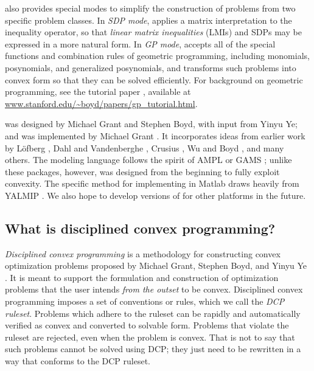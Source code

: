 \documentclass[12pt]{article}
\begin{document}
\cvx also provides special modes to simplify 
the construction of problems
from two specific problem classes. In \emph{SDP mode}, \cvx applies
a matrix interpretation to the inequality operator, so that
\emph{linear matrix inequalities} (LMIs) and SDPs may be expressed
in a more natural form. In \emph{GP mode}, \cvx accepts all of the
special functions and combination rules of geometric programming,
including monomials, posynomials, and generalized posynomials,
and transforms such problems into convex form
so that they can be solved efficiently.
For background on geometric programming, see the tutorial paper
\cite{BKVH:05}, available
at \url{www.stanford.edu/~boyd/papers/gp_tutorial.html}.

\cvx was designed by Michael Grant and Stephen Boyd, with input from
Yinyu Ye; and was implemented by Michael Grant \cite{GBY}. It
incorporates ideas from earlier work by 
L\"{o}fberg \cite{YALMIP}, 
Dahl and Vandenberghe \cite{CVXOPT}, 
Crusius \cite{Cru:02}, 
Wu and Boyd \cite{SDPSOL},
and many others.
The modeling language follows
the spirit of AMPL \cite{AMPL} or GAMS \cite{GAMS}; unlike
these packages, however, \cvx was designed from the beginning 
to fully exploit convexity.
The specific method for implementing \cvx in Matlab
draws heavily from YALMIP \cite{YALMIP}. We also hope
to develop versions of \cvx for other platforms in the future.

\subsection{What is disciplined convex programming?}
\label{sec:what-is-dcp}

\emph{Disciplined convex programming} is
a methodology for constructing convex optimization problems
proposed by Michael Grant, Stephen Boyd, and Yinyu Ye \cite{GBY,Gra:04}.
It is meant to support the formulation and
construction of optimization problems that the user 
intends \emph{from the outset} to be convex.
Disciplined convex programming imposes a
set of conventions or rules, which we call the \emph{DCP ruleset}.
Problems which adhere to the ruleset can be rapidly and automatically
verified as convex and converted to solvable form.
Problems that violate the ruleset are rejected, even 
when the problem is convex.
That is not to say that such problems cannot be solved using DCP; they
just need to be rewritten in a way that conforms to the DCP ruleset.
\end{document}
